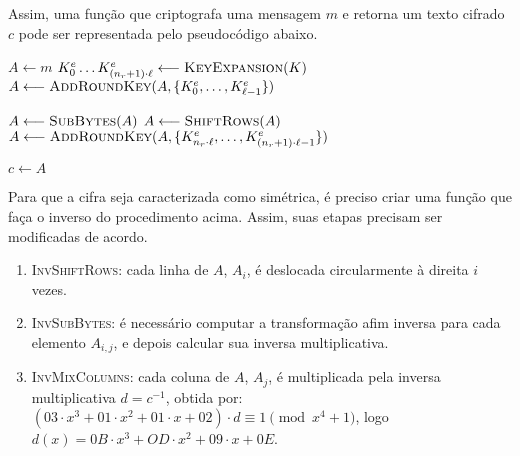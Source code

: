 \documentclass[12pt]{report}
\begin{document}
Assim, uma função que criptografa uma mensagem $m$ e retorna um texto cifrado $c$ pode ser
representada pelo pseudocódigo abaixo.

\begin{algorithm}[H]
    \small

    $A \longleftarrow m$\;
    $K^{e}_{0} \dots K^{e}_{(n_r + 1) \cdot \ell}
        \longleftarrow \textsc{KeyExpansion}(K)$\;
    $A \longleftarrow \textsc{AddRoundKey}(A,
        \{K^{e}_{0}, \dots, K^{e}_{\ell - 1}\})$\;
    
 
    $A \longleftarrow \textsc{SubBytes}(A)$\;
    $A \longleftarrow \textsc{ShiftRows}(A)$\;
    $A \longleftarrow \textsc{AddRoundKey}(A,
        \{K^{e}_{n_r \cdot \ell}, \dots, K^{e}_{(n_r + 1) \cdot \ell - 1}\})$\;

    $c \longleftarrow A$\;
\end{algorithm}

Para que a cifra seja caracterizada como simétrica, é preciso criar uma função que faça o inverso do procedimento acima. Assim, suas etapas precisam ser modificadas de acordo.

\begin{enumerate}[label=\roman*.]

    \item \textsc{InvShiftRows}: cada linha de $A$, $A_i$, é deslocada circularmente à direita $i$ vezes.

    \item \textsc{InvSubBytes}: é necessário computar a transformação afim inversa para cada elemento $A_{i,j}$, e depois calcular sua inversa multiplicativa.
    
    \item \textsc{InvMixColumns}: cada coluna de $A$, $A_j$, é multiplicada pela inversa multiplicativa $d = c^{-1}$, obtida por: $(03 \cdot x^{3} + 01 \cdot x^{2} + 01 \cdot x + 02) \cdot d \equiv 1 \pmod{x^{4} + 1}$, logo $d(x) = 0B \cdot x^{3} + OD \cdot x^{2} + 09 \cdot x + 0E$.

\end{enumerate}
\end{document}
